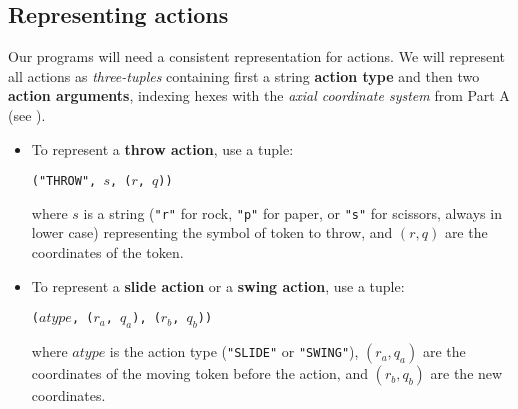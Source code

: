 \documentclass[]{article}
\begin{document}
\subsection{Representing actions}

\begin{multicols}{2}
Our programs will need a consistent representation for actions. We will
represent all actions as \emph{three-tuples} containing first a string
\textbf{action type} and then two \textbf{action arguments}, indexing
hexes with the \emph{axial coordinate system} from Part A
(see ).

\begin{itemize}
    \item
        To represent a \textbf{throw action}, use a tuple:
        \begin{center}
            \texttt{("THROW", $s$, ($r$, $q$))}
        \end{center}
        where
            $s$ is a string (\texttt{"r"} for rock, \texttt{"p"} for paper,
            or \texttt{"s"} for scissors, always in lower case) representing
            the symbol of token to throw, and
            $(r, q)$ are the coordinates of the token.

    \item
        To represent a \textbf{slide action} or a \textbf{swing action},
        use a tuple:
        \begin{center}
            \texttt{($atype$, ($r_a$, $q_a$), ($r_b$, $q_b$))}
        \end{center}
        where
        $atype$ is the action type (\texttt{"SLIDE"} or \texttt{"SWING"}),
        $(r_a, q_a)$ are the coordinates of the moving token before the
        action, and $(r_b, q_b)$ are the new coordinates.
\end{itemize}



\end{multicols}
\end{document}
